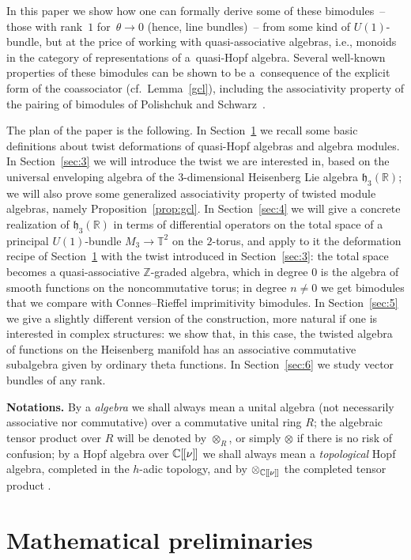 \documentclass[10pt,a4paper]{amsart}
\numberwithin{equation}{section}
\theoremstyle{definition}
\newcommand{\R}{\mathbb{R}}
\newcommand{\C}{\mathbb{C}}
\newcommand{\Z}{\mathbb{Z}}
\newcommand{\T}{\mathbb{T}}
\newcommand{\mf}{\mathfrak}
\newcommand{\lbrak}{[\hspace{-0.5pt}[}
\newcommand{\rbrak}{]\hspace{-0.5pt}]}
\renewcommand{\hbar}{\nu}
\begin{document}
In this paper we show how one can formally derive some of these bimodules~-- those with rank~$1$ for~$\theta\to 0$ (hence, line bundles)~-- from some kind of $U(1)$-bundle, but at the price of working with quasi-associative algebras, i.e., monoids in the category of representations of a~quasi-Hopf algebra.
Several well-known properties of these bimodules can be shown to be a~consequence of the explicit form of the coassociator (cf.~Lemma~\ref{gcl}), including the associativity property of the pairing of bimodules of Polishchuk and Schwarz~\cite{PS02}.

The plan of the paper is the following. In Section~\ref{sec:2} we recall some basic def\/initions about twist deformations of quasi-Hopf algebras and algebra modules. In Section~\ref{sec:3} we will introduce the twist we are interested in, based on the universal enveloping algebra of the $3$-dimensional Heisenberg Lie algebra $\mf{h}_3(\R)$; we will also prove some generalized associativity property of twisted module algebras, namely Proposition~\ref{prop:gcl}. In Section~\ref{sec:4} we will give a concrete realization of $\mf{h}_3(\R)$ in terms of dif\/ferential operators on the total space of a principal $U(1)$-bundle $M_3\to\T^2$ on the $2$-torus, and apply to it the deformation recipe of Section~\ref{sec:2} with the twist introduced in Section~\ref{sec:3}: the total space becomes a quasi-associative $\Z$-graded algebra, which in degree $0$ is the algebra of smooth functions on the noncommutative torus; in degree $n\neq 0$ we get bimodules that we compare with Connes--Rief\/fel imprimitivity bimodules.
In Section~\ref{sec:5} we give a slightly dif\/ferent version of the construction, more natural if one is interested in complex structures: we show that, in this case, the twisted algebra of functions on the Heisenberg manifold has an associative commutative subalgebra given by ordinary theta functions.
In Section~\ref{sec:6} we study vector bundles of any rank.

{\bf Notations.} By a \emph{algebra} we shall always mean a unital algebra (not necessarily associative nor commutative) over a commutative unital ring $R$; the algebraic tensor product over $R$ will be denoted by $\otimes_R$, or simply $\otimes$ if there is no risk of confusion;
by a Hopf algebra over $\C\lbrak\hbar\rbrak$ we shall always mean a \emph{topological} Hopf algebra, completed in the $h$-adic topology, and by $\otimes_{\C\lbrak\hbar\rbrak}$ the completed tensor product \cite[Section~4.1A]{CP94}.

\section{Mathematical preliminaries}\label{sec:2}
\end{document}
